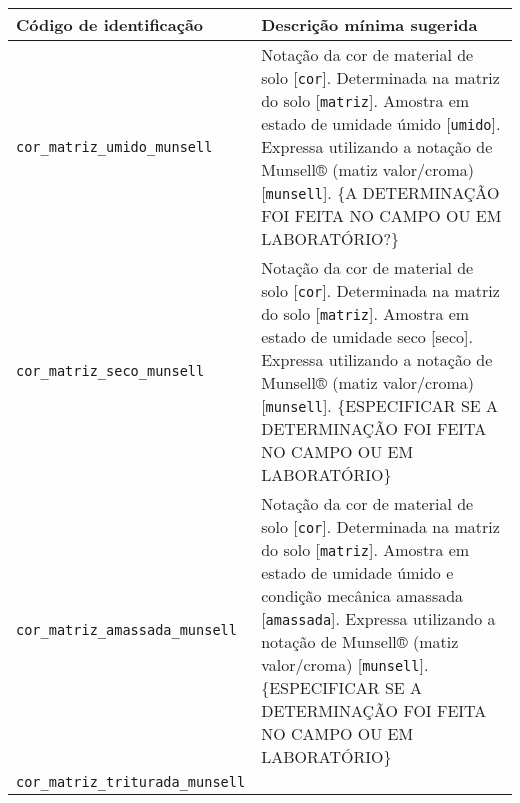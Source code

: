 \documentclass[
]{book}
\begin{document}
\begin{longtable}[]{@{}ll@{}}
\toprule
\begin{minipage}[b]{0.51\columnwidth}\raggedright
Código de identificação\strut
\end{minipage} & \begin{minipage}[b]{0.43\columnwidth}\raggedright
Descrição mínima sugerida\strut
\end{minipage}\tabularnewline
\midrule
\endhead
\begin{minipage}[t]{0.51\columnwidth}\raggedright
\texttt{cor\_matriz\_umido\_munsell}\strut
\end{minipage} & \begin{minipage}[t]{0.43\columnwidth}\raggedright
Notação da cor de material de solo {[}\texttt{cor}{]}. Determinada na matriz do solo {[}\texttt{matriz}{]}. Amostra em estado de umidade úmido {[}\texttt{umido}{]}. Expressa utilizando a notação de Munsell® (matiz valor/croma) {[}\texttt{munsell}{]}. \{A DETERMINAÇÃO FOI FEITA NO CAMPO OU EM LABORATÓRIO?\}\strut
\end{minipage}\tabularnewline
\begin{minipage}[t]{0.51\columnwidth}\raggedright
\texttt{cor\_matriz\_seco\_munsell}\strut
\end{minipage} & \begin{minipage}[t]{0.43\columnwidth}\raggedright
Notação da cor de material de solo {[}\texttt{cor}{]}. Determinada na matriz do solo {[}\texttt{matriz}{]}. Amostra em estado de umidade seco {[}seco{]}. Expressa utilizando a notação de Munsell® (matiz valor/croma) {[}\texttt{munsell}{]}. \{ESPECIFICAR SE A DETERMINAÇÃO FOI FEITA NO CAMPO OU EM LABORATÓRIO\}\strut
\end{minipage}\tabularnewline
\begin{minipage}[t]{0.51\columnwidth}\raggedright
\texttt{cor\_matriz\_amassada\_munsell}\strut
\end{minipage} & \begin{minipage}[t]{0.43\columnwidth}\raggedright
Notação da cor de material de solo {[}\texttt{cor}{]}. Determinada na matriz do solo {[}\texttt{matriz}{]}. Amostra em estado de umidade úmido e condição mecânica amassada {[}\texttt{amassada}{]}. Expressa utilizando a notação de Munsell® (matiz valor/croma) {[}\texttt{munsell}{]}. \{ESPECIFICAR SE A DETERMINAÇÃO FOI FEITA NO CAMPO OU EM LABORATÓRIO\}\strut
\end{minipage}\tabularnewline
\begin{minipage}[t]{0.51\columnwidth}\raggedright
\texttt{cor\_matriz\_triturada\_munsell}\strut

\end{minipage}
\end{longtable}
\end{document}
